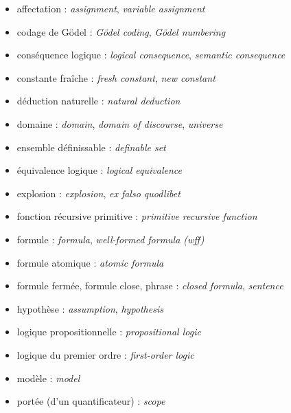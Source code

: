 \documentclass[11pt,class=report,crop=false]{standalone}
\begin{document}
\begin{itemize}

\item affectation : \emph{assignment}, \emph{variable assignment}

\item codage de Gödel : \emph{Gödel coding}, \emph{Gödel numbering}
\item conséquence logique : \emph{logical consequence}, \emph{semantic consequence}
\item constante fraîche : \emph{fresh constant}, \emph{new constant}

\item déduction naturelle : \emph{natural deduction}
\item domaine : \emph{domain}, \emph{domain of discourse}, \emph{universe}

\item ensemble définissable : \emph{definable set}
\item équivalence logique : \emph{logical equivalence}
\item explosion : \emph{explosion}, \emph{ex falso quodlibet}

\item fonction récursive primitive : \emph{primitive recursive function}
\item formule : \emph{formula}, \emph{well-formed formula (wff)}
\item formule atomique : \emph{atomic formula}
\item formule fermée, formule close, phrase : \emph{closed formula}, \emph{sentence}

\item hypothèse : \emph{assumption}, \emph{hypothesis}

\item logique propositionnelle : \emph{propositional logic}
\item logique du premier ordre : \emph{first-order logic}

\item modèle : \emph{model}

\item portée (d'un quantificateur) : \emph{scope}


\end{itemize}
\end{document}
